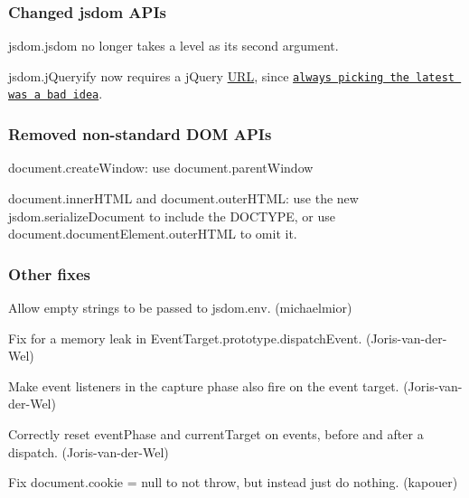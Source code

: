 \subsubsection*{Changed jsdom A\+P\+Is}


\begin{DoxyItemize}
\item {\ttfamily jsdom.\+jsdom} no longer takes a level as its second argument.
\item {\ttfamily jsdom.\+j\+Queryify} now requires a j\+Query \mbox{\hyperlink{namespace_u_r_l}{U\+RL}}, since \href{http://blog.jquery.com/2014/07/03/dont-use-jquery-latest-js/}{\tt always picking the latest was a bad idea}.
\end{DoxyItemize}

\subsubsection*{Removed non-\/standard D\+OM A\+P\+Is}


\begin{DoxyItemize}
\item {\ttfamily document.\+create\+Window}\+: use {\ttfamily document.\+parent\+Window}
\item {\ttfamily document.\+inner\+H\+T\+ML} and {\ttfamily document.\+outer\+H\+T\+ML}\+: use the new {\ttfamily jsdom.\+serialize\+Document} to include the D\+O\+C\+T\+Y\+PE, or use {\ttfamily document.\+document\+Element.\+outer\+H\+T\+ML} to omit it.
\end{DoxyItemize}

\subsubsection*{Other fixes}


\begin{DoxyItemize}
\item Allow empty strings to be passed to {\ttfamily jsdom.\+env}. (michaelmior)
\item Fix for a memory leak in {\ttfamily Event\+Target.\+prototype.\+dispatch\+Event}. (Joris-\/van-\/der-\/\+Wel)
\item Make event listeners in the capture phase also fire on the event target. (Joris-\/van-\/der-\/\+Wel)
\item Correctly reset {\ttfamily event\+Phase} and {\ttfamily current\+Target} on events, before and after a dispatch. (Joris-\/van-\/der-\/\+Wel)
\item Fix {\ttfamily document.\+cookie = null} to not throw, but instead just do nothing. (kapouer)
\end{DoxyItemize}

